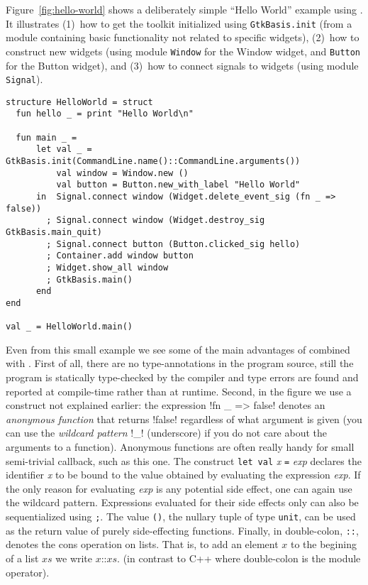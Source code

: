 \documentclass[workingdraft]{usetex-v1}
\begin{document}
Figure~\ref{fig:hello-world} shows a deliberately simple ``Hello World''
example using \mgtk. It illustrates (1)~how to get the toolkit
initialized using \texttt{GtkBasis.init} (from a module containing
basic \gtk functionality not related to specific widgets), (2)~how to
construct new widgets (using module \texttt{Window} for the Window
widget, and \texttt{Button} for the Button widget), and (3)~how to
connect signals to widgets (using module \texttt{Signal}).

\begin{figure*}[htp]
\begin{centering}
\begin{verbatim}
structure HelloWorld = struct
  fun hello _ = print "Hello World\n"

  fun main _ =
      let val _ = GtkBasis.init(CommandLine.name()::CommandLine.arguments())
          val window = Window.new ()
          val button = Button.new_with_label "Hello World"
      in  Signal.connect window (Widget.delete_event_sig (fn _ => false))
        ; Signal.connect window (Widget.destroy_sig GtkBasis.main_quit)
        ; Signal.connect button (Button.clicked_sig hello)
        ; Container.add window button
        ; Widget.show_all window
        ; GtkBasis.main() 
      end
end

val _ = HelloWorld.main()
\end{verbatim}
\caption{Hello World in \mgtk.\label{fig:hello-world}}
\end{centering}
\end{figure*}

Even from this small example we see some of the main advantages of
\sml combined with \gtk.  First of all, there are no type-annotations
in the program source, still the program is statically type-checked by
the compiler and type errors are found and reported at compile-time
rather than at runtime.  Second, in the figure we use a \sml construct
not explained earlier: the expression !fn _ => false!  denotes an
\emph{anonymous function} that returns !false! regardless of what
argument is given (you can use the \emph{wildcard pattern} !_!
(underscore) if you do not care about the arguments to a function).
Anonymous functions are often really handy for small semi-trivial
callback, such as this one.  The construct \texttt{let}~\texttt{val}
\textit{x} \texttt{=} \textit{exp} declares the identifier \textit{x}
to be bound to the value obtained by evaluating the expression
\textit{exp}.  If the only reason for evaluating \textit{exp} is any
potential side effect, one can again use the wildcard pattern.
Expressions evaluated for their side effects only can also be
sequentialized using \texttt{;}.  The value \texttt{()}, the nullary
tuple of type \texttt{unit}, can be used as the return value of purely
side-effecting functions.  Finally, in \sml double-colon, \texttt{::},
denotes the cons operation on lists.  That is, to add an element $x$
to the begining of a list $\mathit{xs}$ we write $x \texttt{::}
\mathit{xs}$. (in contrast to C++ where double-colon is the module operator).
\end{document}
